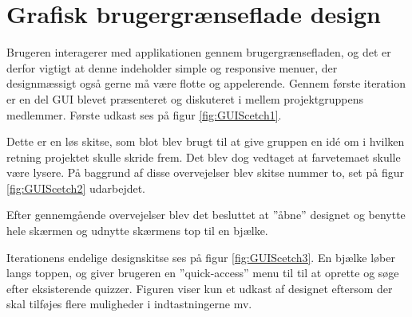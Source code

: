 \section{Grafisk brugergrænseflade design}
Brugeren interagerer med applikationen gennem brugergrænsefladen, og det er derfor vigtigt at denne indeholder simple og responsive menuer, der designmæssigt også gerne må være flotte og appelerende.  
Gennem første iteration er en del GUI blevet præsenteret og diskuteret i mellem projektgruppens medlemmer. Første udkast ses på figur \ref{fig:GUIScetch1}.


Dette er en løs skitse, som blot blev brugt til at give gruppen en idé om i hvilken retning projektet skulle skride frem. Det blev dog vedtaget at farvetemaet skulle være lysere.
På baggrund af disse overvejelser blev skitse nummer to, set på figur \ref{fig:GUIScetch2} udarbejdet.


Efter gennemgående overvejelser blev det  besluttet at ''åbne'' designet og benytte hele skærmen og udnytte skærmens top til en bjælke.


Iterationens endelige designskitse ses på figur \ref{fig:GUIScetch3}. En bjælke løber langs toppen, og giver brugeren en ''quick-access'' menu til til at oprette og søge efter eksisterende quizzer. Figuren viser kun et udkast af designet eftersom der skal tilføjes flere muligheder i indtastningerne mv.
